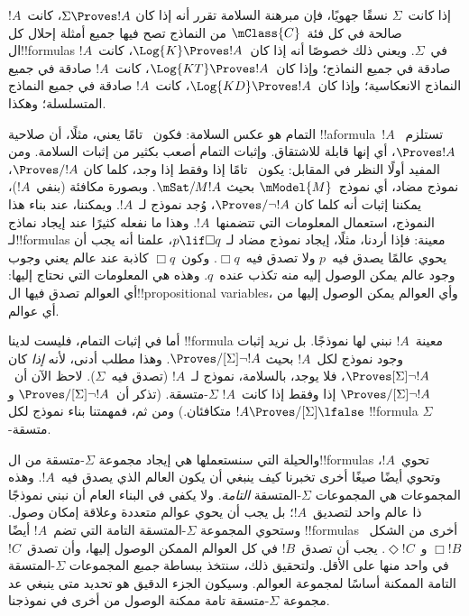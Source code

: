 \documentclass[../../../include/open-logic-section]{subfiles}
\begin{document}


إذا كانت~$\Sigma$ نسقًا جهويًا، فإن مبرهنة السلامة تقرر أنه إذا كان
$\Sigma \Proves !A$، كانت~$!A$ صالحة في كل فئة~$\mClass{C}$ من
النماذج تصح فيها جميع أمثلة إحلال كل ال!!{formula}s في~$\Sigma$.
ويعني ذلك خصوصًا أنه إذا كان~$\Log{K} \Proves !A$، كانت~$!A$ صادقة
في جميع النماذج؛ وإذا كان~$\Log{KT} \Proves !A$، كانت~$!A$ صادقة في
جميع النماذج الانعكاسية؛ وإذا كان~$\Log{KD} \Proves !A$، كانت~$!A$
صادقة في جميع النماذج المتسلسلة؛ وهكذا.

التمام هو عكس السلامة: فكون~ تامًا يعني، مثلًا، أن صلاحية
!!a{formula}~$!A$ تستلزم~$\Proves !A$، أي إنها قابلة للاشتقاق.
وإثبات التمام أصعب بكثير من إثبات السلامة. ومن المفيد أولًا النظر في
المقابل: يكون~ تامًا إذا وفقط إذا وجد، كلما كان
$\Proves/ !A$، نموذج مضاد، أي نموذج~$\mModel{M}$ بحيث
$\mSat/{M}{!A}$. وبصورة مكافئة (بنفي~$!A$)، يمكننا إثبات أنه كلما كان
$\Proves/ \lnot !A$، وُجد نموذج لـ~$!A$. ويمكننا، عند بناء هذا النموذج،
استعمال المعلومات التي تتضمنها~$!A$. وهذا ما نفعله كثيرًا عند إيجاد
نماذج لـ!!{formula}s معينة: فإذا أردنا، مثلًا، إيجاد نموذج مضاد لـ
$p \lif \Box q$، علمنا أنه يجب أن يحوي عالمًا يصدق فيه~$p$ ولا تصدق
فيه~$\Box q$. وكون~$\Box q$ كاذبة عند عالم يعني وجوب وجود عالم يمكن
الوصول إليه منه تكذب عنده~$q$. وهذه هي المعلومات التي نحتاج إليها:
أي العوالم تصدق فيها ال!!{propositional variable}s، وأي العوالم يمكن
الوصول إليها من أي عوالم.

أما في إثبات التمام، فليست لدينا !!{formula} معينة~$!A$ نبني لها
نموذجًا. بل نريد إثبات وجود نموذج لكل~$!A$ بحيث
$\Proves/[\Sigma] \lnot !A$. وهذا مطلب أدنى، لأنه \emph{إذا} كان
$\Proves[\Sigma] \lnot !A$، فلا يوجد، بالسلامة، نموذج لـ~$!A$ (تصدق
فيه~$\Sigma$). لاحظ الآن أن~$\Proves/[\Sigma] \lnot !A$ إذا وفقط إذا
كانت~$!A$ $\Sigma$-متسقة. (تذكر أن~$\Proves/[\Sigma] \lnot !A$ و
$!A \Proves/[\Sigma] \lfalse$ متكافئان.) ومن ثم، فمهمتنا بناء نموذج
لكل !!{formula} $\Sigma$-متسقة.

والحيلة التي سنستعملها هي إيجاد مجموعة $\Sigma$-متسقة من
ال!!{formula}s تحوي~$!A$، وتحوي أيضًا صيغًا أخرى تخبرنا كيف ينبغي أن
يكون العالم الذي يصدق فيه~$!A$. وهذه المجموعات هي المجموعات
$\Sigma$-المتسقة \emph{التامة}.
ولا يكفي في البناء العام أن نبني نموذجًا ذا عالم واحد
لتصديق~$!A$؛ بل يجب أن يحوي عوالم متعددة وعلاقة إمكان وصول. وستحوي
المجموعة $\Sigma$-المتسقة التامة التي تضم~$!A$ أيضًا !!{formula}s أخرى
من الشكل~$\Box !B$ و~$\Diamond !C$. يجب أن تصدق~$!B$ في كل العوالم
الممكن الوصول إليها، وأن تصدق~$!C$ في واحد منها على الأقل. ولتحقيق
ذلك، سنتخذ ببساطة \emph{جميع} المجموعات $\Sigma$-المتسقة التامة
الممكنة أساسًا لمجموعة العوالم. وسيكون الجزء الدقيق هو تحديد متى ينبغي
عد مجموعة $\Sigma$-متسقة تامة ممكنة الوصول من أخرى في نموذجنا.
\end{document}
